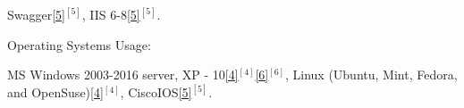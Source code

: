\begin{cventries}
{\begin{cvitems}
{        \textcolor{rainbowcolor-olive}{Swagger\ref{5}{$^{[5]}$}},        
        \textcolor{rainbowcolor-olive}{IIS 6-8\ref{5}{$^{[5]}$}}.%
		}
      \end{cvitems}
    }  
    
%    
%    
  \cventry
    {Operating Systems Usage:} %
    {} 
    {} 
    {} 
    {
      \vspace{0.1cm}
      \begin{cvitems} %
        \item[] {
        \textcolor{rainbowcolor-orange}{MS Windows 2003-2016 server, XP - 10\ref{4}{$^{[4]}$}\ref{6}{$^{[6]}$}}, 
        \textcolor{rainbowcolor-orange}{Linux (Ubuntu, Mint, Fedora, and OpenSuse)\ref{4}{$^{[4]}$}},
        \textcolor{rainbowcolor-orange}{CiscoIOS\ref{5}{$^{[5]}$}}.} 
      \end{cvitems}
    }  
  \vspace{-0.6cm} 
    


\end{cventries}
